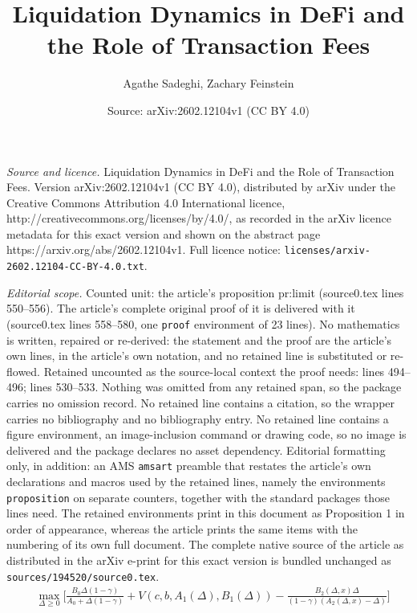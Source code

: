 \documentclass[10pt,a4paper]{amsart}
\title{Liquidation Dynamics in DeFi and the Role of Transaction Fees}
\author{Agathe Sadeghi, Zachary Feinstein}
\date{Source: arXiv:2602.12104v1 (CC BY 4.0)}
\begin{document}
\maketitle

\noindent\emph{Source and licence.} Liquidation Dynamics in DeFi and the Role of Transaction Fees. Version arXiv:2602.12104v1 (CC BY 4.0), distributed by arXiv under the Creative Commons Attribution 4.0 International licence, http://creativecommons.org/licenses/by/4.0/, as recorded in the arXiv licence metadata for this exact version and shown on the abstract page https://arxiv.org/abs/2602.12104v1. Full licence notice: \texttt{licenses/arxiv-2602.12104-CC-BY-4.0.txt}.\par\smallskip

\noindent\textit{Editorial scope.} Counted unit: the article's proposition pr:limit (source0.tex lines 550--556). The article's complete original proof of it is delivered with it (source0.tex lines 558--580, one \texttt{proof} environment of 23 lines). No mathematics is written, repaired or re-derived: the statement and the proof are the article's own lines, in the article's own notation, and no retained line is substituted or re-flowed.  Retained uncounted as the source-local context the proof needs: lines 494--496; lines 530--533.  Nothing was omitted from any retained span, so the package carries no omission record.  No retained line contains a citation, so the wrapper carries no bibliography and no bibliography entry.  No retained line contains a figure environment, an image-inclusion command or drawing code, so no image is delivered and the package declares no asset dependency.  Editorial formatting only, in addition: an AMS \texttt{amsart} preamble that restates the article's own declarations and macros used by the retained lines, namely the environments \texttt{proposition} on separate counters, together with the standard packages those lines need.  The retained environments print in this document as Proposition 1 in order of appearance, whereas the article prints the same items with the numbering of its own full document.  The complete native source of the article as distributed in the arXiv e-print for this exact version is bundled unchanged as \texttt{sources/194520/source0.tex}.
\begin{align}
\label{eq:MEV-opt} &\max_{\Delta\geq 0}\bigg[\frac{B_0\Delta(1-\gamma)}{A_0+\Delta(1-\gamma)} + V(c,b,A_1(\Delta),B_1(\Delta)) - \frac{B_2(\Delta,x)\Delta}{(1-\gamma)(A_2(\Delta,x)-\Delta)}\bigg]
\end{align}
\end{document}
